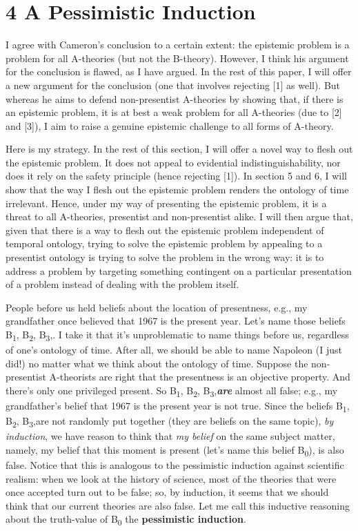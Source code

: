 \documentclass[a4paper,12pt]{article}
\begin{document}
\section*{4 A Pessimistic Induction}

I agree with Cameron's conclusion to a certain extent: the epistemic problem is a problem for all A-theories (but not the B-theory). However, I think his argument for the conclusion is flawed, as I have argued. In the rest of this paper, I will offer a new argument for the conclusion (one that involves rejecting [1] as well). But whereas he aims to defend non-presentist A-theories by showing that, if there is an epistemic problem, it is at best a weak problem for all A-theories (due to [2] and [3]), I aim to raise a genuine epistemic challenge to all forms of A-theory.

Here is my strategy. In the rest of this section, I will offer a novel way to flesh out the epistemic problem. It does not appeal to evidential indistinguishability, nor does it rely on the safety principle (hence rejecting [1]). In section 5 and 6, I will show that the way I flesh out the epistemic problem renders the ontology of time irrelevant. Hence, under my way of presenting the epistemic problem, it is a threat to all A-theories, presentist and non-presentist alike. I will then argue that, given that there is a way to flesh out the epistemic problem independent of temporal ontology, trying to solve the epistemic problem by appealing to a presentist ontology is trying to solve the problem in the wrong way: it is to address a problem by targeting something contingent on a particular presentation of a problem instead of dealing with the problem itself.

People before us held beliefs about the location of presentness, e.g., my grandfather once believed that 1967 is the present year. Let's name those beliefs B\textsubscript{1}, B\textsubscript{2}, B\textsubscript{3},\textellipsis. I take it that it's unproblematic to name things before us, regardless of one's ontology of time. After all, we should be able to name Napoleon (I just did!) no matter what we think about the ontology of time. Suppose the non-presentist A-theorists are right that the presentness is an objective property. And there's only one privileged present. So B\textsubscript{1}, B\textsubscript{2}, B\textsubscript{3},\textellipsis \emph{\textbf{are}} almost all false; e.g., my grandfather's belief that 1967 is the present year is not true. Since the beliefs B\textsubscript{1}, B\textsubscript{2}, B\textsubscript{3},\textellipsis are not randomly put together (they are beliefs on the same topic), \emph{by induction}, we have reason to think that \emph{my belief} on the same subject matter, namely, my belief that this moment is present (let's name this belief B\textsubscript{0}), is also false. Notice that this is analogous to the pessimistic induction against scientific realism: when we look at the history of science, most of the theories that were once accepted turn out to be false; so, by induction, it seems that we should think that our current theories are also false. Let me call this inductive reasoning about the truth-value of B\textsubscript{0} the \textbf{pessimistic induction}.
\end{document}
